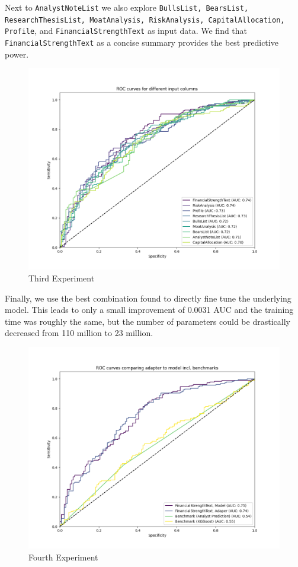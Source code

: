 \documentclass[conference]{IEEEtran}
\begin{document}
Next to \texttt{AnalystNoteList} we also explore \texttt{BullsList, BearsList, ResearchThesisList, MoatAnalysis, RiskAnalysis, CapitalAllocation, Profile}, and  \texttt{FinancialStrengthText} as input data. We find that \texttt{FinancialStrengthText} as a concise summary provides the best predictive power.

\begin{figure}[h!]
    \centering
    \includegraphics[width=.85\linewidth]{../3. evaluation/roc_curves/Third Experiment.png}
    \caption[Third Experiment]{Third Experiment}
    \label{fig:Thirdexp}
\end{figure}

Finally, we use the best combination found to directly fine tune the underlying model. This leads to only a small improvement of 0.0031 AUC and the training time was roughly the same, but the number of parameters could be drastically decreased from 110 million to 23 million.

\begin{figure}[h!]
    \centering
    \includegraphics[width=.85\linewidth]{../3. evaluation/roc_curves/Fourth Experiment.png}
    \caption[Fourth Experiment]{Fourth Experiment}
    \label{fig:Fourthexp}
\end{figure}
\end{document}
